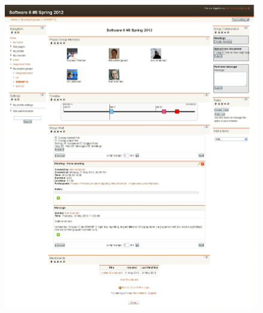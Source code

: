 \begin{figure}[h]
	\centering
		\includegraphics[width=\textwidth]{images/projectgroupwithedit.png}
	\label{fig:projectgroupwithedit}
\end{figure}
